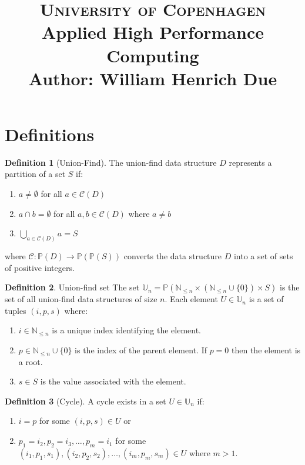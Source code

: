 \documentclass[a4paper,12pt]{article}
\title{
    {\Large \textsc{University of Copenhagen}} \\[5pt]
    {\large Applied High Performance Computing} \\[10pt]
    Author: William Henrich Due \\[0pt]
}
\author{}
\date{}
\theoremstyle{definition}
\newtheorem{definition}{Definition}[section]
\begin{document}
\maketitle
\thispagestyle{firstpage}

\section{Definitions}

\begin{definition}[Union-Find]\label{def:union-find} The
    union-find data structure $D$ represents a partition of a set
    $S$ if:
    \begin{enumerate}
        \item $a \neq \emptyset$ for all $a \in \mathcal{C}(D)$
        \item $a \cap b = \emptyset$ for all $a, b \in \mathcal{C}(D)$ where $a \neq b$
        \item $\bigcup_{a \in \mathcal{C}(D)} a = S$
    \end{enumerate}
    where $\mathcal{C} : \mathbb{P}(D) \to \mathbb{P}(\mathbb{P}(S))$ converts the data structure $D$ into a set of sets of positive integers.
\end{definition}

\begin{definition}{Union-find set}
    The set $\mathbb{U}_n = \mathbb{P}(\mathbb{N}_{\leq n} \times (\mathbb{N}_{\leq n} \cup \{0\}) \times S)$ is the set of all union-find data structures of size $n$. Each element $U \in \mathbb{U}_n$ is a set of tuples $(i, p, s)$ where:
    \begin{enumerate}
        \item $i \in \mathbb{N}_{\leq n}$ is a unique index identifying the element.
        \item $p \in \mathbb{N}_{\leq n} \cup \{0\}$ is the index of the parent element. If $p = 0$ then the element is a root.
        \item $s \in S$ is the value associated with the element.
    \end{enumerate}
\end{definition}

\begin{definition}[Cycle]\label{def:cycle}
    A cycle exists in a set $U \in \mathbb{U}_n$ if:
    \begin{enumerate}
        \item $i = p$ for some $(i, p, s) \in U$ or
        \item $p_1 = i_2, p_2 = i_3, \ldots, p_m = i_1$ for some $(i_1, p_1, s_1), (i_2, p_2, s_2), \ldots, (i_m, p_m, s_m) \in U$ where $m > 1$.
    \end{enumerate}
\end{definition}
\end{document}
